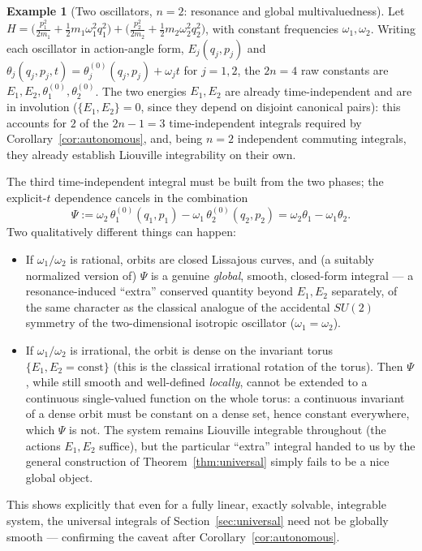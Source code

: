 \documentclass[11pt]{article}
\theoremstyle{definition}
\newtheorem{example}[theorem]{Example}
\theoremstyle{remark}
\newcommand{\PB}[2]{\{#1,#2\}}
\begin{document}
\begin{example}[Two oscillators, $n=2$: resonance and global multivaluedness]\label{ex:pair}
Let $H=\big(\tfrac{p_1^2}{2m_1}+\tfrac12m_1\omega_1^2q_1^2\big)+\big(\tfrac{p_2^2}{2m_2}+\tfrac12m_2\omega_2^2q_2^2\big)$,
with constant frequencies $\omega_1,\omega_2$. Writing each oscillator in
action-angle form, $E_j(q_j,p_j)$ and $\theta_j(q_j,p_j,t)=\theta_j^{(0)}(q_j,p_j)+\omega_jt$
for $j=1,2$, the $2n=4$ raw constants are $E_1,E_2,\theta_1^{(0)},\theta_2^{(0)}$.
The two energies $E_1,E_2$ are already time-independent and are in
involution ($\PB{E_1}{E_2}=0$, since they depend on disjoint canonical
pairs): this accounts for $2$ of the $2n-1=3$ time-independent integrals
required by Corollary~\ref{cor:autonomous}, and, being $n=2$ independent
commuting integrals, they already establish Liouville integrability on
their own.

The third time-independent integral must be built from the two phases; the
explicit-$t$ dependence cancels in the combination
\begin{equation}
\Psi:=\omega_2\,\theta_1^{(0)}(q_1,p_1)-\omega_1\,\theta_2^{(0)}(q_2,p_2)
=\omega_2\theta_1-\omega_1\theta_2 .
\end{equation}
Two qualitatively different things can happen:
\begin{itemize}
\item If $\omega_1/\omega_2$ is rational, orbits are closed Lissajous
curves, and (a suitably normalized version of) $\Psi$ is a genuine
\emph{global}, smooth, closed-form integral --- a resonance-induced
``extra'' conserved quantity beyond $E_1,E_2$ separately, of the same
character as the classical analogue of the accidental $SU(2)$ symmetry of
the two-dimensional isotropic oscillator ($\omega_1=\omega_2$).
\item If $\omega_1/\omega_2$ is irrational, the orbit is dense on the
invariant torus $\{E_1,E_2=\text{const}\}$ (this is the classical
irrational rotation of the torus). Then $\Psi$, while still smooth and
well-defined \emph{locally}, cannot be extended to a continuous
single-valued function on the whole torus: a continuous invariant of a
dense orbit must be constant on a dense set, hence constant everywhere,
which $\Psi$ is not. The system remains Liouville integrable throughout
(the actions $E_1,E_2$ suffice), but the particular ``extra'' integral
handed to us by the general construction of Theorem~\ref{thm:universal}
simply fails to be a nice global object.
\end{itemize}
This shows explicitly that even for a fully linear, exactly solvable,
integrable system, the universal integrals of Section~\ref{sec:universal}
need not be globally smooth --- confirming the caveat after
Corollary~\ref{cor:autonomous}.
\end{example}
\end{document}
